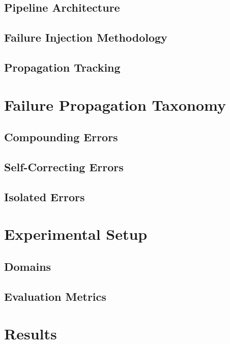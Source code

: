 \documentclass{article}
\begin{document}
\subsection{Pipeline Architecture}
\subsection{Failure Injection Methodology}
\subsection{Propagation Tracking}

\section{Failure Propagation Taxonomy}
\subsection{Compounding Errors}
\subsection{Self-Correcting Errors}
\subsection{Isolated Errors}

\section{Experimental Setup}
\subsection{Domains}
\subsection{Evaluation Metrics}

\section{Results}
\end{document}
